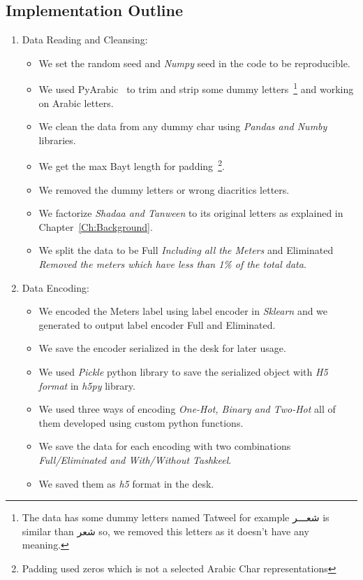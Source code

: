 \subsection{Implementation Outline}

\begin{enumerate}
  \item Data Reading and Cleansing:
  \begin{itemize}
    \item We set the random seed and \textit{Numpy} seed in the code to be reproducible.
    \item We used PyArabic~\cite{Pyarabic_2010} to trim and strip some dummy letters~\footnote{The data has some dummy letters named Tatweel for example \textarabic{شعـــر} is similar than \textarabic{شعر} so, we removed this letters as it doesn't have any meaning. } and working on Arabic letters.
    \item We clean the data from any dummy char using \textit{Pandas and Numby} libraries.
    \item We get the max Bayt length for padding~\footnote{Padding used zeros which is not a selected Arabic Char representations}.
    \item We removed the dummy letters or wrong diacritics letters.
    \item We factorize \textit{Shadaa and Tanween} to its original letters as explained in Chapter~\ref{Ch:Background}.
    \item We split the data to be Full\textit{ Including all the Meters} and Eliminated\textit{ Removed the meters which have less than 1\% of the total data}.
  \end{itemize}
  
  \item Data Encoding:
  \begin{itemize}
    \item We encoded the Meters label using label encoder in \textit{Sklearn} and we generated to output label encoder Full and Eliminated.
    \item We save the encoder serialized in the desk for later usage.
    \item We used \textit{Pickle} python library to save the serialized object with \textit{H5 format} in \textit{h5py} library.
    \item We used three ways of encoding \textit{One-Hot, Binary and Two-Hot} all of them developed using custom python functions.
    \item We save the data for each encoding with two combinations \textit{Full/Eliminated and With/Without Tashkeel}.
    \item We saved them as \textit{h5} format in the desk.
  \end{itemize}


\end{enumerate}
